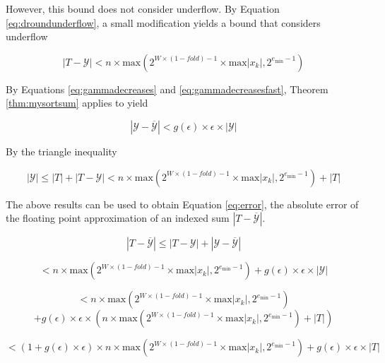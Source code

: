 \documentclass[12pt]{article}
\providecommand{\min}{\ensuremath{\text{min}}}
\providecommand{\max}{\ensuremath{\text{max}}}
\theoremstyle{definition}
\numberwithin{equation}{section}
\begin{document}
    However, this bound does not consider underflow. By Equation \ref{eq:droundunderflow}, a small modification yields a bound that considers underflow

    \begin{equation}
      \label{eq:repbound}
      |T - \mathcal{Y}| < n \times \max(2^{W \times (1 - fold) - 1} \times \max|x_k|, 2^{e_{\min} - 1})
    \end{equation}

    By Equations \ref{eq:gammadecreases} and \ref{eq:gammadecreasesfast}, Theorem \ref{thm:mysortsum} applies to yield

    \begin{equation*}
      |\mathcal{Y} - \overline{\mathcal{Y}}| < g(\epsilon)\times\epsilon\times|\mathcal{Y}|
    \end{equation*}

    By the triangle inequality

    \begin{equation*}
      |\mathcal{Y}| \leq |T| + |T - \mathcal{Y}| < n \times \max(2^{W \times (1 - fold) - 1} \times \max|x_k|, 2^{e_{\min} - 1}) + |T|
    \end{equation*}

    The above results can be used to obtain Equation \ref{eq:error}, the absolute error of the floating point approximation of an indexed sum $|T - \overline{\mathcal{Y}}|$.

    \begin{equation*}
      |T - \overline{\mathcal{Y}}| \leq |T - \mathcal{Y}| + |\mathcal{Y} - \overline{\mathcal{Y}}|
    \end{equation*}

    \begin{equation*}
      < n \times \max(2^{W \times (1 - fold) - 1} \times \max|x_k|, 2^{e_{\min} - 1}) + g(\epsilon)\times \epsilon\times |\mathcal{Y}|
    \end{equation*}

    \begin{equation*}
      < n \times \max(2^{W \times (1 - fold) - 1} \times \max|x_k|, 2^{e_{\min} - 1})
    \end{equation*}
    \begin{equation*}
      + g(\epsilon)\times \epsilon\times (n \times \max(2^{W \times (1 - fold) - 1} \times \max|x_k|, 2^{e_{\min} - 1}) + |T|)
    \end{equation*}

    \begin{equation}
      < (1 + g(\epsilon)\times\epsilon) \times n \times \max(2^{W \times (1 - fold) - 1} \times \max|x_k|, 2^{e_{\min} - 1}) + g(\epsilon)\times\epsilon\times |T|
      \label{eq:error}
    \end{equation}
\end{document}
